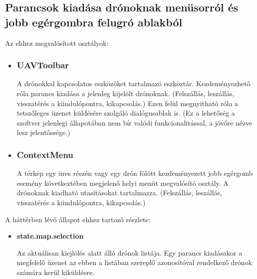 \subsection{Parancsok kiadása drónoknak menüsorról és jobb egérgombra felugró ablakból}

\noindent Az ehhez megvalósított osztályok:
\begin{itemize}


\item\subsubsection{UAVToolbar}
A drónokkal kapcsolatos eszközöket tartalmazó eszköztár. Kezdeményezhető róla
parancs kiadása a jelenleg kijelölt drónoknak. (Felszállás, leszállás,
visszatérés a kiindulópontra, kikapcsolás.) Ezen felül megnyitható róla a
tetszőleges üzenet küldésére szolgáló dialógusablak is. (Ez a lehetőség a
szoftver jelenlegi állapotában nem bír valódi funkcionalitással, a jövőre nézve
lesz jelentőssége.)

\item\subsubsection{ContextMenu}
A térkép egy üres részén vagy egy drón fölött kezdeményezett jobb egérgomb
esemény következtében megjelenő helyi menüt megvalósító osztály. A drónoknak
kiadható utasításokat tartalmazza. (Felszállás, leszállás, visszatérés a
kiindulópontra, kikapcsolás.)

\end{itemize}

\noindent A háttérben lévő állapot ehhez tartozó részlete:
\begin{itemize}

  \item \textbf{state.map.selection}

  Az aktuálisan kiejlölés alatt álló drónok listája. Egy parancs kiadásakor a
  megfelelő üzenet az ebben a listában szereplő azonosítóval rendelkező drónok
  számára kerül kiküldésre.

\end{itemize}

